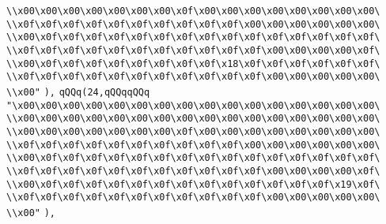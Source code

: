 \verb|\\x00\x00\x00\x00\x00\x00\x00\x0f\x00\x00\x00\x00\x00\x00\x00\x00\|\newline
\verb|\\x0f\x0f\x0f\x0f\x0f\x0f\x0f\x0f\x0f\x0f\x00\x00\x00\x00\x00\x00\|\newline
\verb|\\x00\x0f\x0f\x0f\x0f\x0f\x0f\x0f\x0f\x0f\x0f\x0f\x0f\x0f\x0f\x0f\|\newline
\verb|\\x0f\x0f\x0f\x0f\x0f\x0f\x0f\x0f\x0f\x0f\x0f\x00\x00\x00\x00\x0f\|\newline
\verb|\\x00\x0f\x0f\x0f\x0f\x0f\x0f\x0f\x0f\x18\x0f\x0f\x0f\x0f\x0f\x0f\|\newline
\verb|\\x0f\x0f\x0f\x0f\x0f\x0f\x0f\x0f\x0f\x0f\x0f\x00\x00\x00\x00\x00\|\newline
\verb|\\x00"|\newline
\verb|),|\newline
\verb|qQQq(24,qQQqqQQq|\newline
\verb|"\x00\x00\x00\x00\x00\x00\x00\x00\x00\x00\x00\x00\x00\x00\x00\x00\|\newline
\verb|\\x00\x00\x00\x00\x00\x00\x00\x00\x00\x00\x00\x00\x00\x00\x00\x00\|\newline
\verb|\\x00\x00\x00\x00\x00\x00\x00\x0f\x00\x00\x00\x00\x00\x00\x00\x00\|\newline
\verb|\\x0f\x0f\x0f\x0f\x0f\x0f\x0f\x0f\x0f\x0f\x00\x00\x00\x00\x00\x00\|\newline
\verb|\\x00\x0f\x0f\x0f\x0f\x0f\x0f\x0f\x0f\x0f\x0f\x0f\x0f\x0f\x0f\x0f\|\newline
\verb|\\x0f\x0f\x0f\x0f\x0f\x0f\x0f\x0f\x0f\x0f\x0f\x00\x00\x00\x00\x0f\|\newline
\verb|\\x00\x0f\x0f\x0f\x0f\x0f\x0f\x0f\x0f\x0f\x0f\x0f\x0f\x0f\x19\x0f\|\newline
\verb|\\x0f\x0f\x0f\x0f\x0f\x0f\x0f\x0f\x0f\x0f\x0f\x00\x00\x00\x00\x00\|\newline
\verb|\\x00"|\newline
\verb|),|\newline
